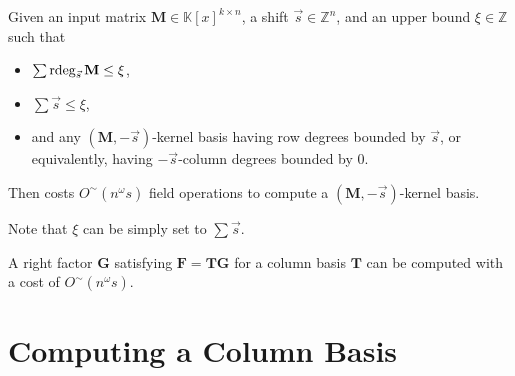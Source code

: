 \begin{lem}
\label{lem:costKernelBasisReverse}Given an input matrix $\mathbf{M}\in\mathbb{K}\left[x\right]^{k\times n}$,
a shift $\vec{s}\in\mathbb{Z}^{n}$, and an upper bound $\xi\in\mathbb{Z}$
such that 
\begin{itemize}
\item $\sum\rdeg_{\vec{s}}\mathbf{M}\le\xi$,
\item $\sum\vec{s}\le\xi$,
\item and any $\left(\mathbf{M},-\vec{s}\right)$-kernel basis having row
degrees bounded by $\vec{s}$, or equivalently, having $-\vec{s}$-column
degrees bounded by 0.
\end{itemize}
Then  costs $O^{\sim}\left(n^{\omega}s\right)$
field operations to compute a $\left(\mathbf{M},-\vec{s}\right)$-kernel
basis.

Note that $\xi$ can be simply set to $\sum\vec{s}$.\end{lem}
\begin{thm}
A right factor $\mathbf{G}$ satisfying $\mathbf{F}=\mathbf{TG}$
for a column basis $\mathbf{T}$ can be computed with a cost of $O^{\sim}\left(n^{\omega}s\right)$. 
\end{thm}

\section{Computing a Column Basis}

